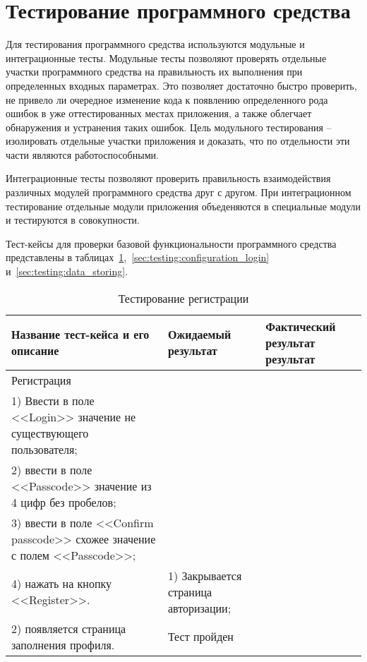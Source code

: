 \section{Тестирование программного средства}
\label{sec:testing}

Для тестирования программного средства используются модульные и интеграционные тесты. Модульные тесты позволяют проверять отдельные участки программного средства на правильность их выполнения при определенных входных параметрах. Это позволяет достаточно быстро проверить, не привело ли очередное изменение кода к появлению определенного рода ошибок в уже оттестированных местах приложения, а также облегчает обнаружения и устранения таких ошибок. Цель модульного тестирования -- изолировать отдельные участки приложения и доказать, что по отдельности эти части являются работоспособными. 

Интеграционные тесты позволяют проверить правильность взаимодействия различных модулей программного средства друг с другом. При интеграционном тестирование отдельные модули приложения объеденяются в специальные модули и тестируются в совокупности.

Тест-кейсы для проверки базовой функциональности программного средства представлены в таблицах~\ref{sec:testing:configuration_register},~\ref{sec:testing:configuration_login} и~\ref{sec:testing:data_storing}.

\begin{longtable}[l]{| >{\raggedright}p{}
                     | >{\raggedright}p{}
                     | >{\raggedright\arraybackslash}p{}|}
  \caption{Тестирование регистрации}
  \label{sec:testing:configuration_register} \tabularnewline

  \hline
       Название тест-кейса и его описание & Ожидаемый результат & Фактический результат результат \\
   \hline
   Регистрация\\ 
   1) Ввести в поле <<Login>> значение не существующего пользователя; \\
   2) ввести в поле <<Passcode>> значение из 4 цифр без пробелов; \\  
   3) ввести в поле <<Confirm passcode>> схожее значение с полем <<Passcode>>; \\ 
   4) нажать на кнопку <<Register>>.

   &
   1) Закрывается страница авторизации; \\
   2) появляется страница заполнения профиля.

   & Тест пройден \\
   \hline
\end{longtable}

